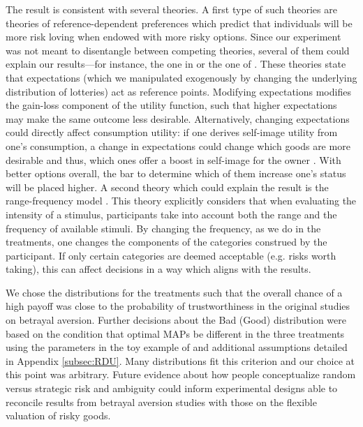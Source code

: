 The result is consistent with several theories.
A first type of such theories are theories of reference-dependent preferences which predict that individuals will be more risk loving when endowed with more risky options.
Since our experiment was not meant to disentangle between competing theories, several of them could explain our results---for instance, the one in \cite{Koszegi2006,Koszegi2007} or the one of \cite{Wenner2015}.
These theories state that expectations (which we manipulated exogenously by changing the underlying distribution of lotteries) act as reference points.
Modifying expectations modifies the gain-loss component of the utility function, such that higher expectations may make the same outcome less desirable.
Alternatively, changing expectations could directly affect consumption utility: if one derives self-image utility from one's consumption, a change in expectations could change which goods are more desirable and thus, which ones offer a boost in self-image for the owner \citep{Strahilevitz1998,Marzilli2011}.
With better options overall, the bar to determine which of them increase one's status will be placed higher.
A second theory which could explain the result is the range-frequency model \citep{Parducci1965,Parducci1971}.
This theory explicitly considers that when evaluating the intensity of a stimulus, participants take into account both the range and the frequency of available stimuli.
By changing the frequency, as we do in the treatments, one changes the components of the categories construed by the participant.
If only certain categories are deemed acceptable (e.g. risks worth taking), this can affect decisions in a way which aligns with the results.

We chose the distributions for the treatments such that the overall chance of a high payoff was close to the probability of trustworthiness in the original studies on betrayal aversion.
Further decisions about the Bad (Good) distribution were based on the condition that optimal MAPs be different in the three treatments using the parameters in the toy example of \cite{Li2020a} and additional assumptions detailed in Appendix \ref{subsec:RDU}.
Many distributions fit this criterion and our choice at this point was arbitrary.
Future evidence about how people conceptualize random versus strategic risk and ambiguity could inform experimental designs able to reconcile results from betrayal aversion studies with those on the flexible valuation of risky goods.


